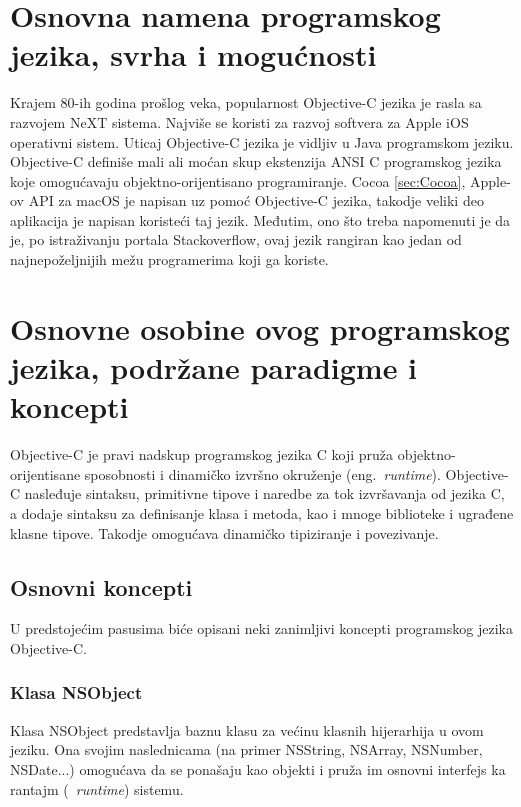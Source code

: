 \documentclass[a4paper]{article}
\begin{document}
{\section{Osnovna namena programskog jezika, svrha i mogućnosti}
\label{sec:namena}
Krajem 80-ih godina prošlog veka, popularnost Objective-C jezika je rasla sa razvojem NeXT sistema. Najviše se koristi za razvoj softvera za Apple iOS operativni sistem. Uticaj Objective-C jezika je vidljiv u Java programskom jeziku.
Objective-C definiše mali ali moćan skup ekstenzija ANSI C programskog jezika koje omogućavaju objektno-orijentisano programiranje. Cocoa \ref{sec:Cocoa}, Apple-ov API za macOS je napisan uz pomoć Objective-C jezika, takodje veliki deo aplikacija je napisan koristeći taj jezik. Međutim, ono što treba napomenuti je da je, po istraživanju portala Stackoverflow, ovaj jezik rangiran kao jedan od najnepoželjnijih mežu programerima koji ga koriste.

\section{Osnovne osobine ovog programskog jezika, podržane paradigme i koncepti}
\label{sec:osobine}
Objective-C je pravi nadskup programskog jezika C koji pruža objektno-orijentisane sposobnosti i dinamičko izvršno okruženje (eng.~{\em runtime}). Objective-C nasleđuje sintaksu, primitivne tipove i naredbe za tok izvršavanja od jezika C, a dodaje sintaksu za definisanje klasa i metoda, kao i mnoge biblioteke i ugrađene klasne tipove. Takodje omogućava dinamičko tipiziranje i povezivanje.

\subsection{Osnovni koncepti}
U predstojećim pasusima biće opisani neki zanimljivi koncepti programskog jezika Objective-C.
\subsubsection{Klasa NSObject}
Klasa NSObject predstavlja baznu klasu za većinu klasnih hijerarhija u ovom jeziku. Ona svojim naslednicama (na primer NSString, NSArray, NSNumber, NSDate...) omogućava da se ponašaju kao objekti i pruža im osnovni interfejs ka rantajm (~{\em runtime}) sistemu.

}
\end{document}
